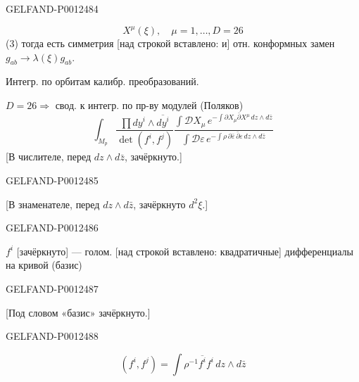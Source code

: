 \begin{GelfandAdjacentEvidence}{GELFAND-P001248}{4}

\begin{equation*}
X^\mu(\xi),\quad\mu=1,\ldots,D=26
\end{equation*}
(3) тогда есть симметрия [над строкой вставлено: и] отн. конформных замен $g_{ab}\to\lambda(\xi)g_{ab}$.

Интегр. по орбитам калибр. преобразований.

\underline{$D=26$}\quad $\Rightarrow$ свод. к интегр. по пр-ву модулей (Поляков)
\begin{equation*}
\int_{M_p}
\frac{\prod dy^i\wedge\overline{dy^i}}{\det(f^i,f^j)}
\frac{\displaystyle\int\mathcal DX_\mu\,
 e^{-\int\partial X_\mu\bar\partial X^\mu\,dz\wedge d\bar z}}
{\displaystyle\int\mathcal D\varepsilon\,
 e^{-\int\rho\,\partial\bar\varepsilon\,\bar\partial\varepsilon\,dz\wedge d\bar z}}
\tag{4}
\end{equation*}
[В числителе, перед $dz\wedge d\bar z$, зачёркнуто.]
\end{GelfandAdjacentEvidence}
\begin{GelfandAdjacentEvidence}{GELFAND-P001248}{5}

[В знаменателе, перед $dz\wedge d\bar z$, зачёркнуто $d^2\xi$.]
\end{GelfandAdjacentEvidence}
\begin{GelfandAdjacentEvidence}{GELFAND-P001248}{6}


$f^i$ [зачёркнуто] — голом. [над строкой вставлено: квадратичные] дифференциалы на кривой (базис)
\end{GelfandAdjacentEvidence}
\begin{GelfandAdjacentEvidence}{GELFAND-P001248}{7}

[Под словом «базис» зачёркнуто.]
\end{GelfandAdjacentEvidence}
\begin{GelfandAdjacentEvidence}{GELFAND-P001248}{8}

\begin{equation*}
(f^i,f^j)=\int\rho^{-1}\overline{f^i}f^i\,dz\wedge d\bar z\tag{5}
\end{equation*}
\end{GelfandAdjacentEvidence}

